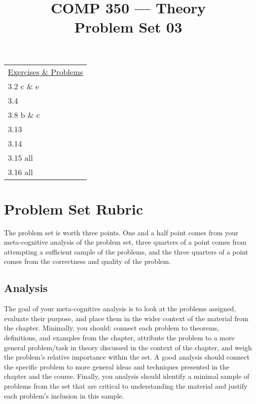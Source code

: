 \documentclass[nobib]{tufte-handout}
\title{COMP 350 --- Theory \\ Problem Set 03}
\begin{document}
\maketitle

\begin{center}
\begin{tabular}{l}
  \underline{Exercises \& Problems} \\
  3.2 c \& e \\ %
  3.4 \\ %
  3.8 b \& c \\ %
  3.13 \\  %
  3.14 \\ %
  3.15 all \\ %
  3.16 all \\ %
\end{tabular}
\end{center}


\section*{Problem Set Rubric}

The problem set is worth three points.  One and a half point comes from your meta-cognitive analysis of the problem set, three quarters of a point comes from attempting a sufficient sample of the problems, and the three quarters of a point comes from the correctness and quality of the problem.

\subsection*{Analysis}

The goal of your meta-cognitive analysis is to look at the problems assigned, evaluate their purpose, and place them in the wider context of the material from the chapter. Minimally, you should: connect each problem to theorems, definitions, and examples from the chapter, attribute the problem to a more general problem/task in theory discussed in the context of the chapter, and weigh the problem's relative importance within the set. A good analysis should connect the specific problem to more general ideas and techniques presented in the chapter and the course. Finally, you analysis should identify a minimal sample of problems from the set that are critical to understanding the material and justify each problem's inclusion in this sample.
\end{document}
